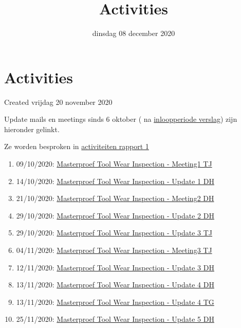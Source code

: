 \documentclass{scrartcl}
\title{Activities}
\date{dinsdag 08 december 2020}
\author{}
\begin{document}
\maketitle

		\section{Activities}

Created vrijdag 20 november 2020



Update mails en meetings sinds 6 oktober ( na \href{../Inloopperiode_verslag.tex}{inloopperiode verslag}) zijn hieronder gelinkt. 

Ze worden besproken in \href{./Activiteiten_rapport_1.tex}{activiteiten rapport 1}



\begin{enumerate}[1]
\item 09/10/2020: \href{./Activities/Masterproef_Tool_Wear_Inspection_-_Meeting1_TJ.tex}{Masterproef Tool Wear Inspection - Meeting1 TJ}
\item 14/10/2020: \href{./Activities/Masterproef_Tool_Wear_Inspection_-_Update_1_DH.tex}{Masterproef Tool Wear Inspection - Update 1 DH}
\item 21/10/2020: \href{./Activities/Masterproef_Tool_Wear_Inspection_-_Meeting2_DH.tex}{Masterproef Tool Wear Inspection - Meeting2 DH}
\item 29/10/2020: \href{./Activities/Masterproef_Tool_Wear_Inspection_-_Update_2_DH.tex}{Masterproef Tool Wear Inspection - Update 2 DH}
\item 29/10/2020: \href{./Activities/Masterproef_Tool_Wear_Inspection_-_Update_3_TJ.tex}{Masterproef Tool Wear Inspection - Update 3 TJ}
\item 04/11/2020: \href{./Activities/Masterproef_Tool_Wear_Inspection_-_Meeting3_TJ.tex}{Masterproef Tool Wear Inspection - Meeting3 TJ}
\item 12/11/2020: \href{./Activities/Masterproef_Tool_Wear_Inspection_-_Update_3_DH.tex}{Masterproef Tool Wear Inspection - Update 3 DH}
\item 13/11/2020: \href{./Activities/Masterproef_Tool_Wear_Inspection_-_Update_4_DH.tex}{Masterproef Tool Wear Inspection - Update 4 DH}
\item 13/11/2020: \href{./Activities/Masterproef_Tool_Wear_Inspection_-_Update_4_TG.tex}{Masterproef Tool Wear Inspection - Update 4 TG} 
\item 25/11/2020: \href{./Activities/Masterproef_Tool_Wear_Inspection_-_Update_5_DH.tex}{Masterproef Tool Wear Inspection - Update 5 DH}
\end{enumerate}
\end{document}
